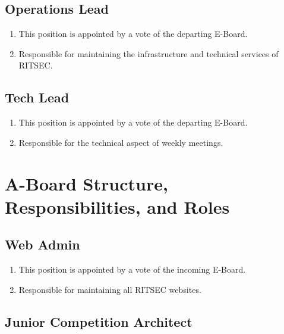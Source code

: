 \documentclass{article}
\begin{document}
\subsection{Operations Lead}

\begin{enumerate}
  \item This position is appointed by a vote of the departing E-Board.
  \item Responsible for maintaining the infrastructure and technical services
    of RITSEC.
\end{enumerate}

\subsection{Tech Lead}

\begin{enumerate}
  \item This position is appointed by a vote of the departing E-Board.
  \item Responsible for the technical aspect of weekly meetings.
\end{enumerate}


\section{A-Board Structure, Responsibilities, and Roles}

\subsection{Web Admin}

\begin{enumerate}
  \item This position is appointed by a vote of the incoming E-Board. 
  \item Responsible for maintaining all RITSEC websites.
\end{enumerate}

\subsection{Junior Competition Architect}
\end{document}
